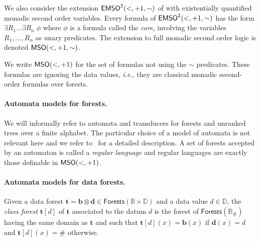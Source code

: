 \documentclass{CSML}
\newcommand\dataeq{\ensuremath{\sim}}
\newcommand\neighbor{\ensuremath{\mathord{+}1}}
\newcommand\descendant{\ensuremath{\mathord{<}}}
\newcommand\emsotwo{\ensuremath{\emso^2(\descendant,\neighbor,\mathord{\sim})}\xspace}
\newcommand\B{\mathbb{B}}
\newcommand\D{\mathbb{D}}
\newcommand\Forests{\mathsf{Forests}}
\newcommand\tree{\boldsymbol{t}}
\newcommand\btree{\boldsymbol{b}}
\newcommand\dtree{\boldsymbol{d}}
\begin{document}
We also consider the extension \emsotwo of \fotwo with existentially quantified
monadic second order variables.  Every formula of \emsotwo has the form
$\exists R_1\ldots \exists R_n\; \phi$ where $\phi$ is a \fotwo formula called
the \emph{core}, involving the variables $R_1, \ldots, R_n$ as unary
predicates.  The extension to full monadic second order logic is denoted
$\mso(<,+1,\dataeq)$.

We write $\mathsf{MSO}(<,+1)$ for the set of formulas not using the $\sim$ predicates.
These formulas are ignoring the data values, \textit{i.e.}, 
they are classical monadic second-order formulas over forests.



\paragraph{Automata models for forests.} 
We will informally refer to automata and transducers 
for forests and unranked trees over a finite alphabet. 
The particular choice of a model of automata is not relevant here 
and we refer to~\cite[Chapters~1,6,8]{tata} for a detailed description. 
A set of forests accepted by an automaton is called a \emph{regular language} 
and regular languages are exactly those definable in $\mathsf{MSO}(<,+1)$.  


\paragraph{Automata models for data forests.}  
Given a data forest $\tree = \btree \otimes \dtree \in \Forests(\B {\times} \D)$ 
and a data value $d \in \D$, the \emph{class forest}\label{def:class-forest} 
$\tree[d]$ of $\tree$ associated to the datum $d$ 
is the forest of $\Forests(\B_\#)$ having the same domain as $\tree$
and such that $\tree[d](x)=\btree(x)$ if $\dtree(x)=d$ and $\tree[d](x)=\#$ otherwise.
\end{document}
